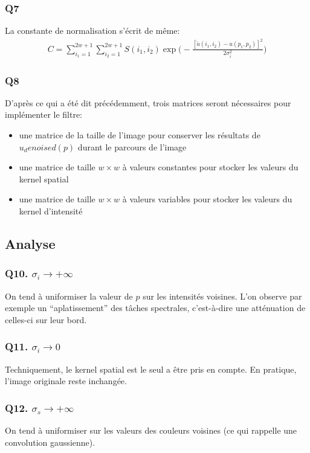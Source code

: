 \documentclass{article}
\begin{document}
\subsubsection*{Q7}
La constante de normalisation s'écrit de même:
\begin{equation*}\begin{split}
C = \displaystyle\sum_{i_1 = 1}^{2w + 1}
\displaystyle\sum_{i_2 = 1}^{2w + 1} S(i_1,i_2) \exp{ \big ( - \frac{[\tilde{u}(i_1, i_2) - u(p_1, p_2)]^2}{2\sigma_i^2} \big )}
\end{split}\end{equation*}
\subsubsection*{Q8}
D'après ce qui a été dit précédemment, trois matrices seront nécessaires pour implémenter le filtre:
\begin{itemize}
\item une matrice de la taille de l'image pour conserver les résultats de $u_denoised(p)$ durant le parcours de l'image
\item une matrice de taille $w \times w$ à valeurs constantes pour stocker les valeurs du kernel spatial
\item une matrice de taille $w \times w$ à valeurs variables pour stocker les valeurs du kernel d'intensité
\end{itemize}
\subsection{Analyse}

\subsubsection*{Q10. $\sigma_i \rightarrow + \infty $}
On tend à uniformiser la valeur de $p$ sur les intensités voisines. L'on observe par exemple un ``aplatissement'' des tâches spectrales, c'est-à-dire une atténuation de celles-ci sur leur bord.

\subsubsection*{Q11. $\sigma_i \rightarrow 0 $}
Techniquement, le kernel spatial est le seul a être 	pris en compte. En pratique, l'image originale reste inchangée.

\subsubsection*{Q12. $\sigma_s \rightarrow + \infty $}
On tend à uniformiser sur les valeurs des couleurs voisines (ce qui rappelle une convolution gaussienne).
\end{document}
